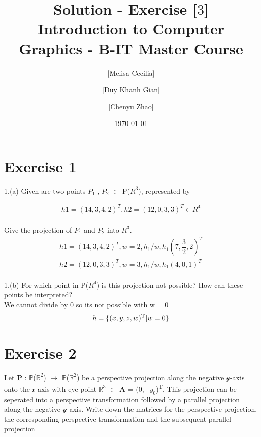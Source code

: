 \documentclass[10pt,a4paper]{article}
\begin{document}
\title{Solution - Exercise [$3$]\\
\small{Introduction to Computer Graphics - B-IT Master Course}}
\author{ [Melisa Cecilia] \and [Duy Khanh Gian] \and [Chenyu Zhao]}
\date{\today}

\maketitle
\section*{Exercise 1}

1.(a) Given are two points $P_1$ , $P_2$ $\in$ P($R^{3}$), represented by

\begin{gather*}
h1 = (14,3,4,2)^{T} , h2=(12,0,3,3)^{T} \in R^{4}  \\
\end{gather*}

Give the projection of $P_1$ and $P_2$ into $R^{3}$. \\

\begin{gather*}
h1 = (14,3,4,2)^{T} ,  w=2 , h_1/w, h_1(7,\dfrac{3}{2},2)^{T}\\
h2 = (12,0,3,3)^{T} ,  w=3 , h_1/w, h_1(4,0,1)^{T}\\
\end{gather*}

1.(b) For which point in P($R^{4}$) is this projection not possible? How can these points be interpreted?\\

We cannot divide by 0 so its not possible with w = 0 \\
\begin{gather*}
h=\{(x,y,z,w)\textsuperscript{T}|w=0 \}\\
\end{gather*}


\section*{Exercise 2}

Let $\mathbf{P}$ : $\mathbb{P}$($\mathbb{R}^{2}$)  $\rightarrow$ $\mathbb{P}$($\mathbb{R}^{2}$) be a perspective projection along the negative $\mathcal{y}$-axis onto the $\mathcal{x}$-axis with eye point $\mathbb{R}^{3}$ $\in$ $\mathbf{A}$ = (0,$-y_0$)\textsuperscript{T}. This projection can be seperated into a perspective transformation followed by a parallel projection along the negative $\mathcal{y}$-axis. Write down the matrices for the perspective projection, the corresponding perspective transformation and the subsequent parallel projection\\
\end{document}

